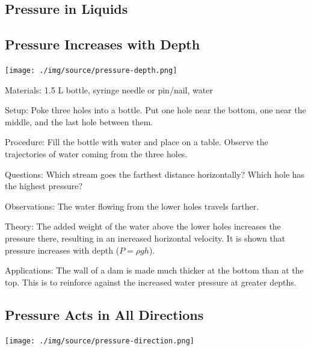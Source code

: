 \begin{multicols}{2}
\section*{Pressure in Liquids}


\subsection{Pressure Increases with Depth}

\begin{center}
\texttt{[image: ./img/source/pressure-depth.png]}
\end{center}

\begin{description*}
\item[Materials:]{1.5 L bottle, syringe needle or pin/nail, water}
\item[Setup:]{Poke three holes into a bottle. Put one hole near the bottom, one near the middle, and the last hole between them.}
\item[Procedure:]{Fill the bottle with water and place on a table. Observe the trajectories of water coming from the three holes.}
\item[Questions:]{Which stream goes the farthest distance horizontally? Which hole has the highest pressure?}
\item[Observations:]{The water flowing from the lower holes travels farther.}
\item[Theory:]{The added weight of the water above the lower holes increases the pressure there, resulting in an increased horizontal velocity. It is shown that pressure increases with depth ($P = \rho g h$).}
\item[Applications:]{The wall of a dam is made much thicker at the bottom than at the top. This is to reinforce against the increased water pressure at greater depths.}
\end{description*}

\subsection{Pressure Acts in All Directions}

\begin{center}
\texttt{[image: ./img/source/pressure-direction.png]}
\end{center}


\end{multicols}
